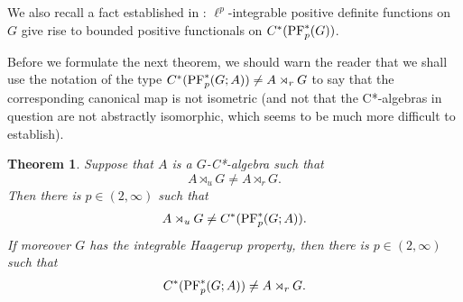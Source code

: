 \documentclass[12pt]{amsart}
\newtheorem{thm}{Theorem}[section]
\theoremstyle{definition}
\theoremstyle{remark}
\numberwithin{equation}{section}
\begin{document}
We also recall a fact established in \cite[Lemma 3.2]{SW2}: $\ell^p$-integrable positive definite functions on $G$ give rise to bounded positive functionals on $C^*(\textup{PF}^*_p(G))$.

Before we formulate the next theorem, we should warn the reader that we shall use the notation of the type $C^*(\textup{PF}^*_p(G;A)) \neq A\rtimes_r G$ to say that the corresponding canonical map is not isometric (and not that the C*-algebras in question are not abstractly isomorphic, which seems to be much more difficult to establish).


\begin{thm} \label{thm:Haagerup}
  Suppose that $A$ is a $G$-C*-algebra such that
  $$A\rtimes_u G\neq A\rtimes_r G.$$ Then
there is $p\in (2,\infty)$ such that
  \begin{align*}
    A\rtimes_u G\neq C^*(\textup{PF}^*_p(G;A)).
  \end{align*}
If moreover $G$ has the integrable Haagerup property, then
  there is $p\in (2,\infty)$ such that
  \begin{align*}
 C^*(\textup{PF}^*_p(G;A)) \neq A\rtimes_r G.
  \end{align*}
\end{thm}
\end{document}
